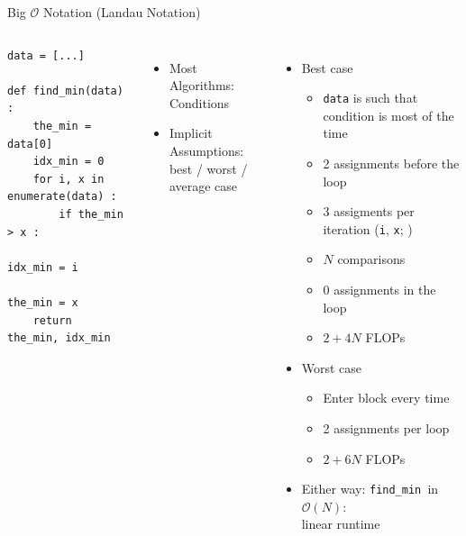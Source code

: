 \begin{frame}[fragile]{Big $\mathcal{O}$ Notation (Landau Notation)}
%
\vspace{-6pt}
\begin{columns}[T]
\begin{codebox}
\begin{verbatim}
data = [...]

def find_min(data) :
    the_min = data[0]
    idx_min = 0
    for i, x in enumerate(data) :
        if the_min > x :
            idx_min = i
            the_min = x
    return the_min, idx_min
\end{verbatim}
\end{codebox}
\begin{itemize}
\item Most Algorithms: Conditions
\item Implicit Assumptions:\\
	best / worst / average case
\end{itemize}
%

\begin{itemize}
\item Best case
	\begin{itemize}
	\item \texttt{data} is such that  condition is  most of the time
	\item 2 assignments before the loop
	\item 3 assigments per iteration (\texttt{i}, \texttt{x}; )
	\item $N$ comparisons
	\item 0 assignments in the loop
	\item[\Thus] $2 + 4N$ FLOPs
	\end{itemize}
\item Worst case
	\begin{itemize}
	\item Enter  block every time
	\item 2 assignments per loop
	\item[\Thus] $2 + 6N$ FLOPs
	\end{itemize}
\item Either way: \texttt{find\_min }in $\mathcal{O}(N)$:\\
	linear runtime
\end{itemize}
\end{columns}
%
\end{frame}

